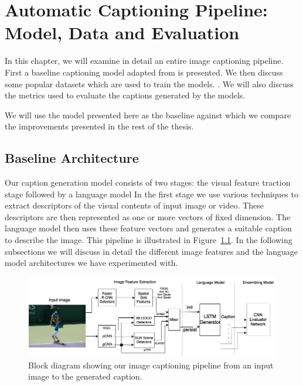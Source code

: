 \chapter{Automatic Captioning Pipeline: Model, Data and Evaluation}
\label{chapter:baseline}
In this chapter, we will examine in detail an entire image captioning pipeline.
First a baseline captioning model adapted from \cite{Vinyals_2015_CVPR} is
presented. We then discuss some popular datasets which are used to train the
models. . We will also discuss the metrics
used to evaluate the captions generated by the models. 

We will use the model presented here as the baseline against which we compare
the improvements presented in the rest of the thesis.

\section{Baseline Architecture}
Our caption generation model consists of two stages: the visual feature
traction stage followed by a language model
In the first stage we use various techniques to extract descriptors of the
visual contents of input image or video. These descriptors are then represented
as one or more vectors of fixed dimension. 
The language model then uses these feature vectors and generates a suitable
caption to describe the image. 
This pipeline is illustrated in Figure~\ref{fig:fullModel}. 
In the following subsections we will discuss in detail the different
image features and the language model architectures we have
experimented with.

\begin{figure}[t]
  \begin{center}
    \includegraphics[width=0.8\linewidth]{images/AcMM_fullModel.png}
  \end{center}
  \vspace*{-3mm}
  \caption{Block diagram showing our image captioning pipeline from an
    input image to the generated caption.}
  \label{fig:fullModel}
\end{figure}

